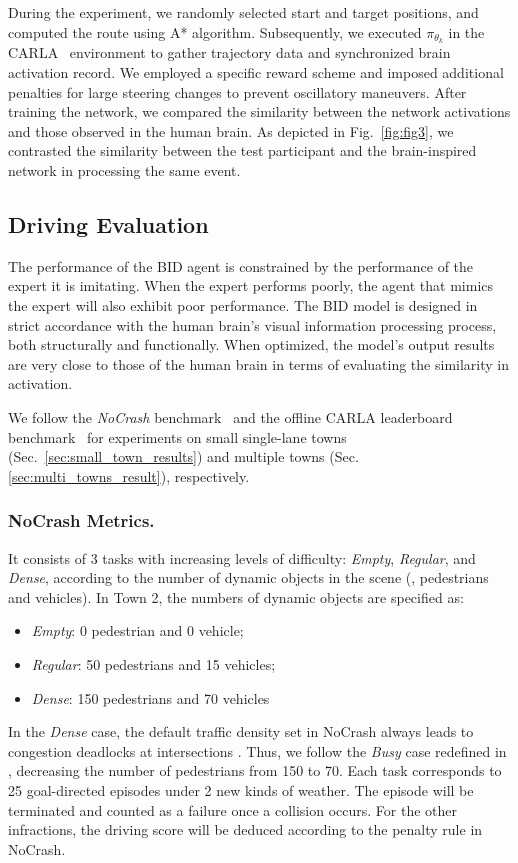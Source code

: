 During the experiment, we randomly selected start and target positions, and computed the route using A* algorithm. 
Subsequently, we executed $\pi_{\theta_{k}}$ in the CARLA~\cite{Dosovitskiy17} environment to gather trajectory data and synchronized brain activation record.
We employed a specific reward scheme and imposed additional penalties for large steering changes to prevent oscillatory maneuvers. 
After training the network, we compared the similarity between the network activations and those observed in the human brain. 
As depicted in Fig.~\ref{fig:fig3}, we contrasted the similarity between the test participant and the brain-inspired network in processing the same event.


\subsection{Driving Evaluation}
\label{sec:Metrics}
The performance of the BID agent is constrained by the performance of the expert it is imitating. 
When the expert performs poorly, the agent that mimics the expert will also exhibit poor performance. 
The BID model is designed in strict accordance with the human brain's visual information processing process, both structurally and functionally. 
When optimized, the model's output results are very close to those of the human brain in terms of evaluating the similarity in activation.


We follow the \emph{NoCrash} benchmark~\cite{Codevilla:2019} and the offline CARLA leaderboard benchmark~\cite{Zhang:2021,Hu:2022} for experiments on small single-lane towns (Sec.~\ref{sec:small_town_results}) and multiple towns (Sec.~ \ref{sec:multi_towns_result}), respectively.


\subsubsection{NoCrash Metrics.}\label{nocrash_metrics}
It consists of 3 tasks with increasing levels of difficulty: \emph{Empty}, \emph{Regular}, and \emph{Dense}, according to the number of dynamic objects in the scene ({\ie}, pedestrians and vehicles). 
In Town 2, the numbers of dynamic objects are specified as:
\begin{itemize}
	\item \emph{Empty}: 0 pedestrian and 0 vehicle;
	\item \emph{Regular}: 50 pedestrians and 15 vehicles;
	\item \emph{Dense}: 150 pedestrians and 70 vehicles
\end{itemize}
In the \emph{Dense} case, the default traffic density set in NoCrash always leads to congestion deadlocks at intersections \cite{Zhang:2021}. 
Thus, we follow the \emph{Busy} case redefined in \cite{Zhang:2021}, decreasing the number of pedestrians from 150 to 70. 
Each task corresponds to 25 goal-directed episodes under 2 new kinds of weather.
The episode will be terminated and counted as a failure once a collision occurs. 
For the other infractions, the driving score will be deduced according to the penalty rule in NoCrash. 


